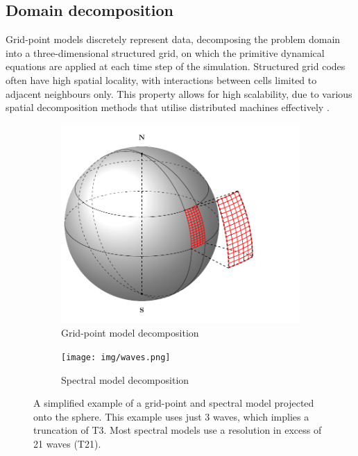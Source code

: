 \documentclass[a4paper,11pt]{report}
\begin{document}
\subsection{Domain decomposition}
\label{sec:spectral-domain}
Grid-point models discretely represent data,  decomposing the problem domain into a three-dimensional structured grid, on which the primitive dynamical equations are applied at each time step of the simulation. Structured grid codes often have high spatial locality, with interactions between cells limited to adjacent neighbours only. This property allows for high scalability, due to various spatial decomposition methods that utilise distributed machines effectively \cite{mcintosh2014performance}. 
\begin{figure}[htbp]
\centering
\begin{subfigure}{.5\textwidth}
  \centering
  \includegraphics[width=.99\linewidth]{img/sphere-decomp.pdf}
  \caption{Grid-point model decomposition}
  \label{fig:sub1}
\end{subfigure}%
\begin{subfigure}{.5\textwidth}
  \centering
  \texttt{[image: img/waves.png]}
  \caption{Spectral model decomposition}
  \label{fig:sub2}
\end{subfigure}
\caption[Grid-point and spectral domain decomposition]{A simplified example of a grid-point and spectral model projected onto the sphere. This example uses just 3 waves, which implies a truncation of T3. Most spectral models use a resolution in excess of 21 waves (T21). }
\label{fig:test}
\end{figure}
\end{document}
